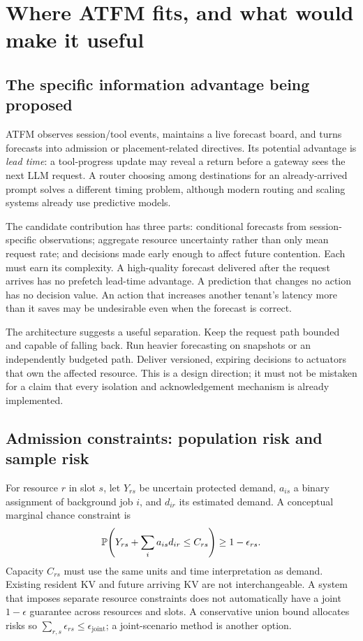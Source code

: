 \section{Where ATFM fits, and what would make it useful}
\label{sec:atfm}
\subsection{The specific information advantage being proposed}
ATFM observes session/tool events, maintains a live forecast board, and turns
forecasts into admission or placement-related directives. Its potential
advantage is \emph{lead time}: a tool-progress update may reveal a return before
a gateway sees the next LLM request. A router choosing among destinations for
an already-arrived prompt solves a different timing problem, although modern
routing and scaling systems already use predictive models.


The candidate contribution has three parts: conditional forecasts from
session-specific observations; aggregate resource uncertainty rather than only
mean request rate; and decisions made early enough to affect future contention.
Each must earn its complexity. A high-quality forecast delivered after the
request arrives has no prefetch lead-time advantage. A prediction that changes
no action has no decision value. An action that increases another tenant's
latency more than it saves may be undesirable even when the forecast is correct.

The architecture suggests a useful separation. Keep the request path bounded
and capable of falling back. Run heavier forecasting on snapshots or an
independently budgeted path. Deliver versioned, expiring decisions to actuators
that own the affected resource. This is a design direction; it must not be
mistaken for a claim that every isolation and acknowledgement mechanism is
already implemented.

\subsection{Admission constraints: population risk and sample risk}
For resource $r$ in slot $s$, let $Y_{rs}$ be uncertain protected demand,
$a_{is}$ a binary assignment of background job $i$, and $d_{ir}$ its estimated
demand. A conceptual marginal chance constraint is
\begin{equation}
 \mathbb{P}\!\left(Y_{rs}+\sum_i a_{is}d_{ir}\le C_{rs}\right)
 \ge1-\epsilon_{rs}.
 \label{eq:chance}
\end{equation}
Capacity $C_{rs}$ must use the same units and time interpretation as demand.
Existing resident KV and future arriving KV are not interchangeable. A system
that imposes separate resource constraints does not automatically have a joint
$1-\epsilon$ guarantee across resources and slots. A conservative union bound
allocates risks so $\sum_{r,s}\epsilon_{rs}\le\epsilon_{\mathrm{joint}}$;
a joint-scenario method is another option.

